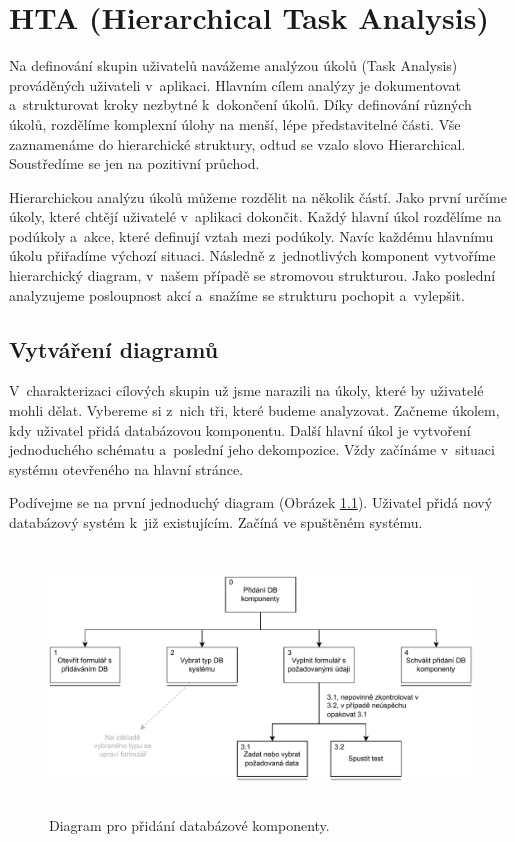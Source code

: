 \chapter{HTA (Hierarchical Task Analysis)}

Na definování skupin uživatelů navážeme analýzou úkolů (Task Analysis) prováděných uživateli v~aplikaci. Hlavním cílem analýzy je dokumentovat a~strukturovat kroky nezbytné k~dokončení úkolů. Díky definování různých úkolů, rozdělíme komplexní úlohy na menší, lépe představitelné části. Vše zaznamenáme do hierarchické struktury, odtud se vzalo slovo Hierarchical. Soustředíme se jen na pozitivní průchod.

Hierarchickou analýzu úkolů můžeme rozdělit na několik částí. Jako první určíme úkoly, které chtějí uživatelé v~aplikaci dokončit. Každý hlavní úkol rozdělíme na podúkoly a~akce, které definují vztah mezi podúkoly. Navíc každému hlavnímu úkolu přiřadíme výchozí situaci. Následně z~jednotlivých komponent vytvoříme hierarchický diagram, v~našem případě se stromovou strukturou. Jako poslední analyzujeme posloupnost akcí a~snažíme se strukturu pochopit a~vylepšit.

\section{Vytváření diagramů}

V~charakterizaci cílových skupin už jsme narazili na úkoly, které by uživatelé mohli dělat. Vybereme si z~nich tři, které budeme analyzovat. Začneme úkolem, kdy uživatel přidá databázovou komponentu. Další hlavní úkol je vytvoření jednoduchého schématu a~poslední jeho dekompozice. Vždy začínáme v~situaci systému otevřeného na hlavní stránce.

Podívejme se na první jednoduchý diagram (Obrázek \ref{obr03:hta1}). Uživatel přidá nový databázový systém k~již existujícím. Začíná ve spuštěném systému.

\begin{figure}[htb]
  \centering
  \includegraphics[height=70mm]{../img/HTA-1}
  \caption{Diagram pro přidání databázové komponenty.}
  \label{obr03:hta1}
\end{figure}

